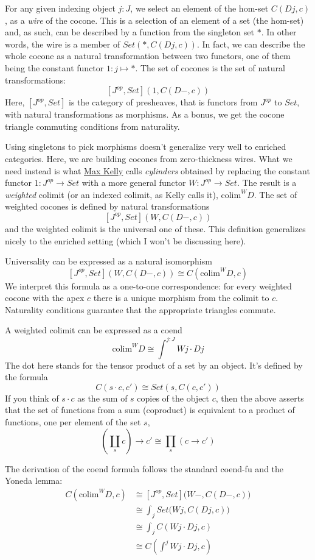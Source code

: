 \documentclass[11pt]{amsart}
\begin{document}
For any given indexing object $j \colon J$, we select an element of the hom-set $C(D j, c)$, as a \emph{wire} of the cocone. This is a selection of an element of a set (the hom-set) and, as such, can be described by a function from the singleton set $*$. In other words, the wire is a member of $Set(*, C(D j, c))$. In fact, we can describe the whole cocone as a natural transformation between two functors, one of them being the constant functor $1 \colon j \mapsto *$. The set of cocones is the set of natural transformations:
\[ [J^{op}, Set](1, C(D -, c))\]
Here, $[J^{op}, Set]$ is the category of presheaves, that is functors from $J^{op}$ to $Set$, with natural transformations as morphisms. As a bonus, we get the cocone triangle commuting conditions from naturality. 

Using singletons to pick morphisms doesn't generalize very well to enriched categories. Here, we are building cocones from zero-thickness wires. What we need instead is what \href{http://www.tac.mta.ca/tac/reprints/articles/10/tr10.pdf}{Max Kelly} calls \emph{cylinders} obtained by replacing the constant functor $1\colon J^{op} \to Set$ with a more general functor $W \colon J^{op} \to Set$. The result is a \emph{weighted} colimit (or an indexed colimit, as Kelly calls it), $\mbox{colim}^W D$. The set of weighted cocones is defined by natural transformations
\[ [J^{op}, Set](W, C(D -, c))\]
and the weighted colimit is the universal one of these. This definition generalizes nicely to the enriched setting (which I won't be discussing here). 

Universality can be expressed as a natural isomorphism
\[[J^{op}, Set](W, C(D -, c))  \cong  C(\mbox{colim}^W D, c)\]
We interpret this formula as a one-to-one correspondence: for every weighted cocone with the apex $c$ there is a unique morphism from the colimit to $c$. Naturality conditions guarantee that the appropriate triangles commute.

A weighted colimit can be expressed as a coend
\[\mbox{colim}^W D \cong \int^{j \colon J} W j \cdot D j\]
The dot here stands for the tensor product of a set by an object. It's defined by the formula
\[C(s \cdot c, c') \cong Set(s, C(c, c'))\]
If you think of $s \cdot c$ as the sum of $s$ copies of the object $c$, then the above asserts that the set of functions from a sum (coproduct) is equivalent to a product of functions, one per element of the set $s$,
\[(\coprod_s c) \to c' \cong \prod_s (c \to c')\]
 
The derivation of the coend formula follows the standard coend-fu and the Yoneda lemma:
\begin{align*}
C(\mbox{colim}^W D, c) & \cong [J^{op}, Set]\big(W-, C(D -, c)\big) \\
 &\cong \int_j Set \big(W j, C(D j, c)\big) \\
 &\cong \int_j C(W j \cdot D j, c) \\
 &\cong C(\int^j W j \cdot D j, c)
\end{align*}
\end{document}
